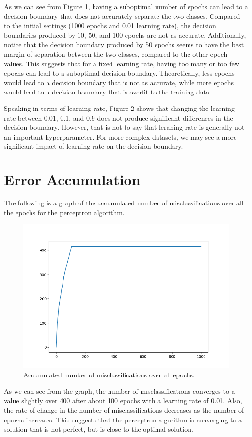 \documentclass{article}
\begin{document}
As we can see from Figure 1, having a suboptimal number of epochs can lead to a decision boundary that does not accurately separate the two classes.
Compared to the initial settings (1000 epochs and 0.01 learning rate), the decision boundaries produced by 10, 50, and 100 epochs are not as accurate.
Additionally, notice that the decision boundary produced by 50 epochs seems to have the best margin of separation between the two classes, compared to the other epoch values.
This suggests that for a fixed learning rate, having too many or too few epochs can lead to a suboptimal decision boundary.
Theoretically, less epochs would lead to a decision boundary that is not as accurate, while more epochs would lead to a decision boundary that is overfit to the training data.

Speaking in terms of learning rate, Figure 2 shows that changing the learning rate between 0.01, 0.1, and 0.9 does not produce significant differences in the decision boundary.
However, that is not to say that leraning rate is generally not an important hyperparameter.
For more complex datasets, we may see a more significant impact of learning rate on the decision boundary.

\newpage

\section{Error Accumulation}

The following is a graph of the accumulated number of misclassifications over all the epochs for the perceptron algorithm.

\begin{figure}[H]
  \centering
  \includegraphics[width=0.65\linewidth]{Figure_3.png}
  \caption{Accumulated number of misclassifications over all epochs.}
\end{figure}

As we can see from the graph, the number of misclassifications converges to a value slightly over 400 after about 100 epochs with a learning rate of 0.01.
Also, the rate of change in the number of misclassifications decreases as the number of epochs increases.
This suggests that the perceptron algorithm is converging to a solution that is not perfect, but is close to the optimal solution.
\end{document}
